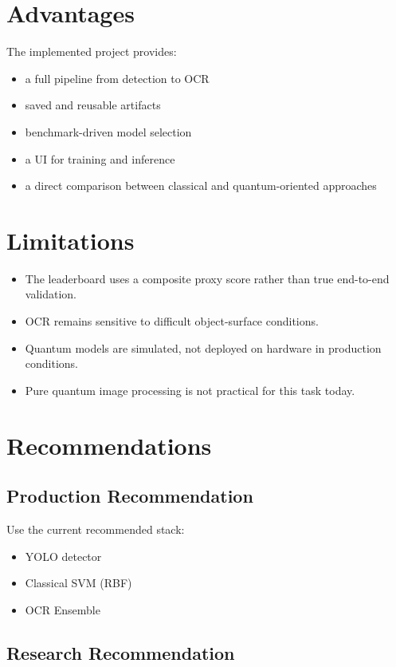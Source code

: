 \documentclass[12pt,a4paper]{article}
\begin{document}
\section{Advantages}

The implemented project provides:
\begin{itemize}
  \item a full pipeline from detection to OCR
  \item saved and reusable artifacts
  \item benchmark-driven model selection
  \item a UI for training and inference
  \item a direct comparison between classical and quantum-oriented approaches
\end{itemize}

\section{Limitations}

\begin{itemize}
  \item The leaderboard uses a composite proxy score rather than true end-to-end validation.
  \item OCR remains sensitive to difficult object-surface conditions.
  \item Quantum models are simulated, not deployed on hardware in production conditions.
  \item Pure quantum image processing is not practical for this task today.
\end{itemize}

\section{Recommendations}

\subsection{Production Recommendation}

Use the current recommended stack:
\begin{itemize}
  \item YOLO detector
  \item Classical SVM (RBF)
  \item OCR Ensemble
\end{itemize}

\subsection{Research Recommendation}
\end{document}
